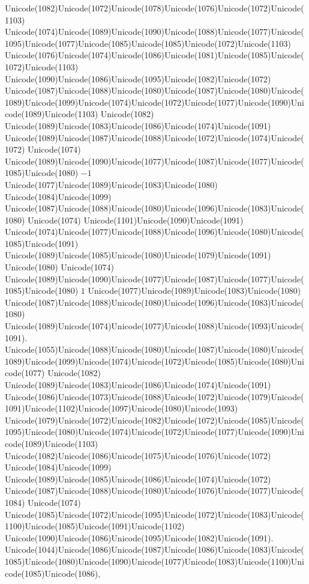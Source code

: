 \documentclass[a4paper,11pt]{report}
\begin{document}
{{Unicode(1082)Unicode(1072)Unicode(1078)Unicode(1076)Unicode(1072)Unicode(1103)
Unicode(1074)Unicode(1089)Unicode(1090)Unicode(1088)Unicode(1077)Unicode(1095)Unicode(1077)Unicode(1085)Unicode(1085)Unicode(1072)Unicode(1103)
Unicode(1076)Unicode(1074)Unicode(1086)Unicode(1081)Unicode(1085)Unicode(1072)Unicode(1103)
Unicode(1090)Unicode(1086)Unicode(1095)Unicode(1082)Unicode(1072)
Unicode(1087)Unicode(1088)Unicode(1080)Unicode(1087)Unicode(1080)Unicode(1089)Unicode(1099)Unicode(1074)Unicode(1072)Unicode(1077)Unicode(1090)Unicode(1089)Unicode(1103)
Unicode(1082)
Unicode(1089)Unicode(1083)Unicode(1086)Unicode(1074)Unicode(1091)
Unicode(1089)Unicode(1087)Unicode(1088)Unicode(1072)Unicode(1074)Unicode(1072)
Unicode(1074)
Unicode(1089)Unicode(1090)Unicode(1077)Unicode(1087)Unicode(1077)Unicode(1085)Unicode(1080) $-1$ Unicode(1077)Unicode(1089)Unicode(1083)Unicode(1080)
Unicode(1084)Unicode(1099)
Unicode(1087)Unicode(1088)Unicode(1080)Unicode(1096)Unicode(1083)Unicode(1080)
Unicode(1074) Unicode(1101)Unicode(1090)Unicode(1091)
Unicode(1074)Unicode(1077)Unicode(1088)Unicode(1096)Unicode(1080)Unicode(1085)Unicode(1091)
Unicode(1089)Unicode(1085)Unicode(1080)Unicode(1079)Unicode(1091)
Unicode(1080) Unicode(1074)
Unicode(1089)Unicode(1090)Unicode(1077)Unicode(1087)Unicode(1077)Unicode(1085)Unicode(1080) $1$ Unicode(1077)Unicode(1089)Unicode(1083)Unicode(1080)
Unicode(1087)Unicode(1088)Unicode(1080)Unicode(1096)Unicode(1083)Unicode(1080)
Unicode(1089)Unicode(1074)Unicode(1077)Unicode(1088)Unicode(1093)Unicode(1091).
Unicode(1055)Unicode(1088)Unicode(1080)Unicode(1087)Unicode(1080)Unicode(1089)Unicode(1099)Unicode(1074)Unicode(1072)Unicode(1085)Unicode(1080)Unicode(1077)
Unicode(1082)
Unicode(1089)Unicode(1083)Unicode(1086)Unicode(1074)Unicode(1091)
Unicode(1086)Unicode(1073)Unicode(1088)Unicode(1072)Unicode(1079)Unicode(1091)Unicode(1102)Unicode(1097)Unicode(1080)Unicode(1093)
Unicode(1079)Unicode(1072)Unicode(1082)Unicode(1072)Unicode(1085)Unicode(1095)Unicode(1080)Unicode(1074)Unicode(1072)Unicode(1077)Unicode(1090)Unicode(1089)Unicode(1103)
Unicode(1082)Unicode(1086)Unicode(1075)Unicode(1076)Unicode(1072)
Unicode(1084)Unicode(1099)
Unicode(1089)Unicode(1085)Unicode(1086)Unicode(1074)Unicode(1072)
Unicode(1087)Unicode(1088)Unicode(1080)Unicode(1076)Unicode(1077)Unicode(1084)
Unicode(1074)
Unicode(1085)Unicode(1072)Unicode(1095)Unicode(1072)Unicode(1083)Unicode(1100)Unicode(1085)Unicode(1091)Unicode(1102)
Unicode(1090)Unicode(1086)Unicode(1095)Unicode(1082)Unicode(1091).
Unicode(1044)Unicode(1086)Unicode(1087)Unicode(1086)Unicode(1083)Unicode(1085)Unicode(1080)Unicode(1090)Unicode(1077)Unicode(1083)Unicode(1100)Unicode(1085)Unicode(1086),
}}
\end{document}
